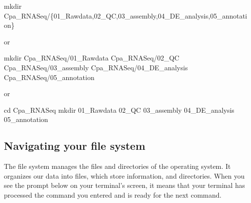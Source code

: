 \documentclass[
  letterpaper,
  DIV=11,
  numbers=noendperiod]{scrreprt}
\newenvironment{Shaded}{\begin{snugshade}}{\end{snugshade}}
\newcommand{\BuiltInTok}[1]{\textcolor[rgb]{0.00,0.23,0.31}{#1}}
\newcommand{\DataTypeTok}[1]{\textcolor[rgb]{0.68,0.00,0.00}{#1}}
\newcommand{\FunctionTok}[1]{\textcolor[rgb]{0.28,0.35,0.67}{#1}}
\newcommand{\NormalTok}[1]{\textcolor[rgb]{0.00,0.23,0.31}{#1}}
\newcommand{\OperatorTok}[1]{\textcolor[rgb]{0.37,0.37,0.37}{#1}}
\begin{document}
\begin{tcolorbox}[enhanced jigsaw, breakable, bottomrule=.15mm, left=2mm, coltitle=black, opacityback=0, colframe=quarto-callout-caution-color-frame, toprule=.15mm, opacitybacktitle=0.6, colbacktitle=quarto-callout-caution-color!10!white, bottomtitle=1mm, colback=white, toptitle=1mm, titlerule=0mm, rightrule=.15mm, arc=.35mm, title=\textcolor{quarto-callout-caution-color}{\faFire}\hspace{0.5em}{Answer}, leftrule=.75mm]

\begin{Shaded}
\begin{Highlighting}[]
\FunctionTok{mkdir}\NormalTok{ Cpa\_RNASeq/}\DataTypeTok{\{01\_Rawdata}\OperatorTok{,}\DataTypeTok{02\_QC}\OperatorTok{,}\DataTypeTok{03\_assembly}\OperatorTok{,}\DataTypeTok{04\_DE\_analysis}\OperatorTok{,}\DataTypeTok{05\_annotation\}}
\end{Highlighting}
\end{Shaded}

or

\begin{Shaded}
\begin{Highlighting}[]
\FunctionTok{mkdir}\NormalTok{ Cpa\_RNASeq/01\_Rawdata Cpa\_RNASeq/02\_QC Cpa\_RNASeq/03\_assembly Cpa\_RNASeq/04\_DE\_analysis Cpa\_RNASeq/05\_annotation}
\end{Highlighting}
\end{Shaded}

or

\begin{Shaded}
\begin{Highlighting}[]
\BuiltInTok{cd}\NormalTok{ Cpa\_RNASeq}
\FunctionTok{mkdir}\NormalTok{ 01\_Rawdata 02\_QC 03\_assembly 04\_DE\_analysis 05\_annotation}
\end{Highlighting}
\end{Shaded}

\end{tcolorbox}

\hypertarget{navigating-your-file-system}{%
\subsection*{Navigating your file
system}\label{navigating-your-file-system}}

The file system manages the files and directories of the operating
system. It organizes our data into files, which store information, and
directories. When you see the prompt below on your terminal's screen, it
means that your terminal has processed the command you entered and is
ready for the next command.
\end{document}
